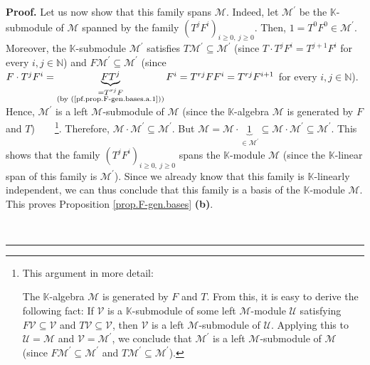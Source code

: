 \documentclass[numbers=enddot,12pt,final,onecolumn,notitlepage]{scrartcl}%
\theoremstyle{definition}
\newenvironment{proof}[1][Proof]{\noindent\textbf{#1.} }{\ \rule{0.5em}{0.5em}}
\begin{document}
\begin{proof}
Let us now show that this family spans $\mathcal{M}$. Indeed, let
$\mathcal{M}^{\prime}$ be the $\mathbb{K}$-submodule of $\mathcal{M}$ spanned
by the family $\left(  T^{j}F^{i}\right)  _{i\geq0,\ j\geq0}$. Then,
$1=T^{0}F^{0}\in\mathcal{M}^{\prime}$. Moreover, the $\mathbb{K}$-submodule
$\mathcal{M}^{\prime}$ satisfies $T\mathcal{M}^{\prime}\subseteq
\mathcal{M}^{\prime}$ (since $T\cdot T^{j}F^{i}=T^{j+1}F^{i}$ for every
$i,j\in\mathbb{N}$) and $F\mathcal{M}^{\prime}\subseteq\mathcal{M}^{\prime}$
(since $F\cdot T^{j}F^{i}=\underbrace{FT^{j}}_{\substack{=T^{rj}F\\\text{(by
(\ref{pf.prop.F-gen.bases.a.1}))}}}F^{i}=T^{rj}FF^{i}=T^{rj}F^{i+1}$ for every
$i,j\in\mathbb{N}$). Hence, $\mathcal{M}^{\prime}$ is a left $\mathcal{M}%
$-submodule of $\mathcal{M}$ (since the $\mathbb{K}$-algebra $\mathcal{M}$ is
generated by $F$ and $T$)\ \ \ \ \footnote{This argument in more detail:
\par
The $\mathbb{K}$-algebra $\mathcal{M}$ is generated by $F$ and $T$. From this,
it is easy to derive the following fact: If $\mathcal{V}$ is a $\mathbb{K}%
$-submodule of some left $\mathcal{M}$-module $\mathcal{U}$ satisfying
$F\mathcal{V}\subseteq\mathcal{V}$ and $T\mathcal{V}\subseteq\mathcal{V}$,
then $\mathcal{V}$ is a left $\mathcal{M}$-submodule of $\mathcal{U}$.
Applying this to $\mathcal{U}=\mathcal{M}$ and $\mathcal{V}=\mathcal{M}%
^{\prime}$, we conclude that $\mathcal{M}^{\prime}$ is a left $\mathcal{M}%
$-submodule of $\mathcal{M}$ (since $F\mathcal{M}^{\prime}\subseteq
\mathcal{M}^{\prime}$ and $T\mathcal{M}^{\prime}\subseteq\mathcal{M}^{\prime}%
$).}. Therefore, $\mathcal{M}\cdot\mathcal{M}^{\prime}\subseteq\mathcal{M}%
^{\prime}$. But $\mathcal{M}=\mathcal{M}\cdot\underbrace{1}_{\in
\mathcal{M}^{\prime}}\subseteq\mathcal{M}\cdot\mathcal{M}^{\prime}%
\subseteq\mathcal{M}^{\prime}$. This shows that the family $\left(  T^{j}%
F^{i}\right)  _{i\geq0,\ j\geq0}$ spans the $\mathbb{K}$-module $\mathcal{M}$
(since the $\mathbb{K}$-linear span of this family is $\mathcal{M}^{\prime}$).
Since we already know that this family is $\mathbb{K}$-linearly independent,
we can thus conclude that this family is a basis of the $\mathbb{K}$-module
$\mathcal{M}$. This proves Proposition \ref{prop.F-gen.bases} \textbf{(b)}.
\medskip


\end{proof}
\end{document}
